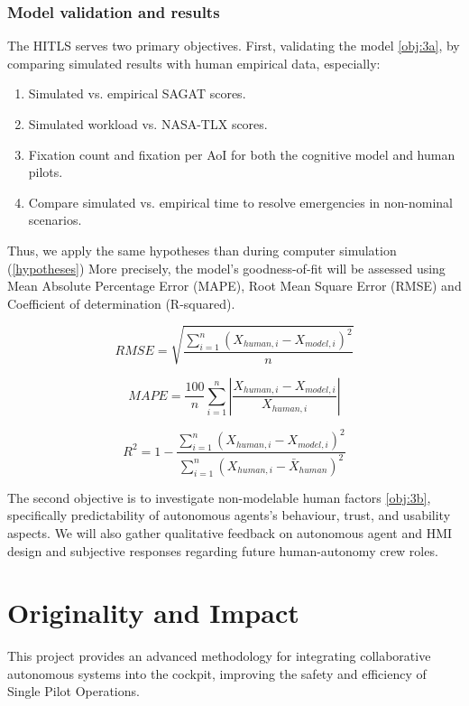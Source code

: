 \documentclass[12pt,a4paper]{article} %
\begin{document}
	\subsubsection{Model validation and results}
	The HITLS serves two primary objectives. First, validating the model \ref{obj:3a}, by comparing simulated results with human empirical data, especially:
	\begin{enumerate}
		\item Simulated vs. empirical SAGAT scores.
		\item Simulated workload vs. NASA-TLX scores.
		\item Fixation count and fixation per AoI for both the cognitive model and human pilots.
		\item Compare simulated vs. empirical time to resolve emergencies in non-nominal scenarios. 
	\end{enumerate}
	Thus, we apply the same hypotheses than during computer simulation (\ref{hypotheses}) 
	More precisely, the model's goodness-of-fit will be assessed using Mean Absolute Percentage Error (MAPE), Root Mean Square Error (RMSE) and Coefficient of determination (R-squared).

	\begin{equation}
		RMSE = \sqrt{\frac{\sum_{i=1}^{n} \left(X_{human,i}-X_{model,i}\right)^2}{n} } 
	\end{equation}

	\begin{equation}
		MAPE = \frac{100}{n} \sum_{i=1}^{n} \left\lvert \frac{X_{human,i} - X_{model,i}}{X_{human,i}} \right\rvert 
	\end{equation}

	\begin{equation}
		R^2 = 1 - \frac{\sum_{i=1}^{n} (X_{human,i} - X_{model,i})^2}{\sum_{i=1}^{n} (X_{human,i} - \bar{X}_{human})^2}
	\end{equation}

	The second objective is to investigate non-modelable human factors \ref{obj:3b}, specifically predictability of autonomous agents's behaviour, trust, and usability aspects. We will also gather qualitative feedback on autonomous agent and HMI design and subjective responses regarding future human-autonomy crew roles.
	
	\section{Originality and Impact} %
	This project provides an advanced methodology for integrating collaborative autonomous systems into the cockpit, improving the safety and efficiency of Single Pilot Operations.
	
\end{document}
